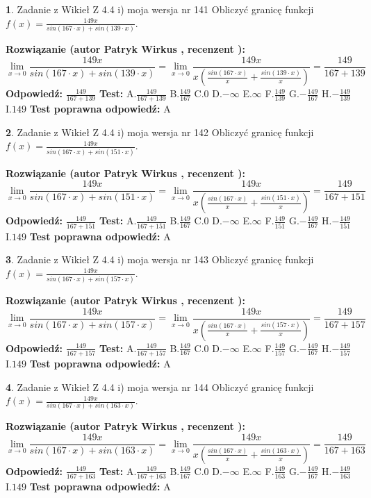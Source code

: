 \documentclass[12pt, a4paper]{article}
\theoremstyle{definition} %
\newtheorem{zad}{}
\newcommand{\zadStart}[1]{\begin{zad}#1\newline}
\newcommand{\zadStop}{\end{zad}}
\newcommand{\rozwStart}[2]{\noindent \textbf{Rozwiązanie (autor #1 , recenzent #2): }\newline}
\newcommand{\rozwStop}{\newline}
\newcommand{\odpStart}{\noindent \textbf{Odpowiedź:}\newline}
\newcommand{\odpStop}{\newline}
\newcommand{\testStart}{\noindent \textbf{Test:}\newline}
\newcommand{\testStop}{\newline}
\newcommand{\kluczStart}{\noindent \textbf{Test poprawna odpowiedź:}\newline}
\newcommand{\kluczStop}{\newline}
\begin{document}
\zadStart{Zadanie z Wikieł Z 4.4 i) moja wersja nr 141}
Obliczyć granicę funkcji $f(x)=\frac{149x}{sin(167\cdot x) +sin(139\cdot x)}$.
\zadStop
\rozwStart{Patryk Wirkus}{}
$$\lim\limits_{x\to 0}\frac{149x}{sin(167\cdot x) +sin(139\cdot x)}=\lim\limits_{x\to 0}\frac{149x}{x(\frac{sin(167\cdot x)}{x}+\frac{sin(139\cdot x)}{x})}=\frac{149}{167+139}$$
\rozwStop
\odpStart
$\frac{149}{167+139}$
\odpStop
\testStart
A.$\frac{149}{167+139}$
B.$\frac{149}{167}$
C.$0$
D.$-\infty$
E.$\infty$
F.$\frac{149}{139}$
G.$-\frac{149}{167}$
H.$-\frac{149}{139}$
I.$149$
\testStop
\kluczStart
A
\kluczStop



\zadStart{Zadanie z Wikieł Z 4.4 i) moja wersja nr 142}
Obliczyć granicę funkcji $f(x)=\frac{149x}{sin(167\cdot x) +sin(151\cdot x)}$.
\zadStop
\rozwStart{Patryk Wirkus}{}
$$\lim\limits_{x\to 0}\frac{149x}{sin(167\cdot x) +sin(151\cdot x)}=\lim\limits_{x\to 0}\frac{149x}{x(\frac{sin(167\cdot x)}{x}+\frac{sin(151\cdot x)}{x})}=\frac{149}{167+151}$$
\rozwStop
\odpStart
$\frac{149}{167+151}$
\odpStop
\testStart
A.$\frac{149}{167+151}$
B.$\frac{149}{167}$
C.$0$
D.$-\infty$
E.$\infty$
F.$\frac{149}{151}$
G.$-\frac{149}{167}$
H.$-\frac{149}{151}$
I.$149$
\testStop
\kluczStart
A
\kluczStop



\zadStart{Zadanie z Wikieł Z 4.4 i) moja wersja nr 143}
Obliczyć granicę funkcji $f(x)=\frac{149x}{sin(167\cdot x) +sin(157\cdot x)}$.
\zadStop
\rozwStart{Patryk Wirkus}{}
$$\lim\limits_{x\to 0}\frac{149x}{sin(167\cdot x) +sin(157\cdot x)}=\lim\limits_{x\to 0}\frac{149x}{x(\frac{sin(167\cdot x)}{x}+\frac{sin(157\cdot x)}{x})}=\frac{149}{167+157}$$
\rozwStop
\odpStart
$\frac{149}{167+157}$
\odpStop
\testStart
A.$\frac{149}{167+157}$
B.$\frac{149}{167}$
C.$0$
D.$-\infty$
E.$\infty$
F.$\frac{149}{157}$
G.$-\frac{149}{167}$
H.$-\frac{149}{157}$
I.$149$
\testStop
\kluczStart
A
\kluczStop



\zadStart{Zadanie z Wikieł Z 4.4 i) moja wersja nr 144}
Obliczyć granicę funkcji $f(x)=\frac{149x}{sin(167\cdot x) +sin(163\cdot x)}$.
\zadStop
\rozwStart{Patryk Wirkus}{}
$$\lim\limits_{x\to 0}\frac{149x}{sin(167\cdot x) +sin(163\cdot x)}=\lim\limits_{x\to 0}\frac{149x}{x(\frac{sin(167\cdot x)}{x}+\frac{sin(163\cdot x)}{x})}=\frac{149}{167+163}$$
\rozwStop
\odpStart
$\frac{149}{167+163}$
\odpStop
\testStart
A.$\frac{149}{167+163}$
B.$\frac{149}{167}$
C.$0$
D.$-\infty$
E.$\infty$
F.$\frac{149}{163}$
G.$-\frac{149}{167}$
H.$-\frac{149}{163}$
I.$149$
\testStop
\kluczStart
A
\kluczStop
\end{document}
